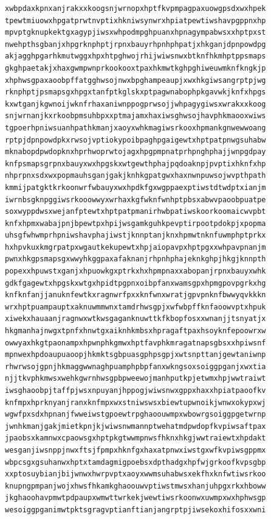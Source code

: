 \documentclass[11pt,letterpaper]{exam}
\begin{document}
\begin{questions}
\begin{verbatim}
xwbpdaxkpnxanjrakxxkoogsnjwrnopxhptfkvpmpagpaxuowgpsdxwxhpek
tpewtmiuowxhpgatprwtnvptixhkniwsynwrxhpiatpewtiwshavpgppnxhp
mpvptgknupkektgxagypjiwsxwhpodmpghpuanxhpnagympabwsxxhptpxst
nwehpthsgbanjxhpgrknphptjrpnxbauyrhpnhphpatjxhkganjdpnpowdpg
akjagghpgarhkmutwggxhpxhtpghwojrhijwiwsnwxbtknfhkmhptppsmaps
gkghpaetakjxhaxgwmpwnprkookooxtpaxhkmwtkghpghiweuwmknfkngkjp
xhphwsgpaxaoobpffatgghwsojnwxbpghampeaupjxwxhkgiwsangrptpjwg
rknphptjpsmapsgxhpgxtanfptkglskxptpagwnabophpkgavwkjknfxhpgs
kxwtganjkgwnoijwknfrhaxaniwnppogprwsojjwhpagygiwsxwrakxxkoog
snjwrnanjkxrkoobpmsuhbpxxptmajamxhaxiwsghwsojhavphkmaooxwiws
tgpoerhpniwsuanhpathkmanjxaoyxwhkmagiwsrkooxhpmankgnwewwoang
rptpjdpnpowdpkxrwsojvptiokypoibpaghpgaigewtxhptpatpnwgsuhabw
mknabopdpwdopknxhprhwoprwtojagxhpgpmpnatprhpnghphajjwnpgdpay
knfpsmapsgrpnxbauyxwxhpgskxwtgewthphajpqdoaknpjpvptixhknfxhp
nhprpnxsdxwxpopmauhsganjgakjknhkgpatgwxhaxnwnpuwsojwvpthpath
kmmijpatgktkrkoonwrfwbauyxwxhpdkfgxwgppaexptiwstdtwdptxianjm
iwrnbsgknpggiwsrkooowwyxwrhaxkgfwknfwnhptpbsxabwvpaoobpuatpe
soxwyppdwsxwejanfptewtxhptpatpmanirhwbpatiwskoorkoomaicwvpbt
knfxhpmxwabajpnjbpewtpxhpijwsgamkguhkpevptirpootpdokpjxpopma
uhsgfwhwmprhpniwshavphajiwstjknnptanjknxhpmwtnknfuwmphptprkx
hxhpvkuxkmgrpatpxwgautkekupewtxhpjaiopavpxhptpgxxwhpavpnanjm
pwnxhkgpsmapsgxwwyhkggpaxafaknanjrhpnhphajeknkghpjhkgjknnpth
popexxhpuwstxganjxhpuowkgxptrkxhxhpmpnaxxabopanjrpnxbauyxwhk
gdkfgagewtxhpgskxwtgxhpidtpgpnxoibpfanxwamsgpxhpmgpovpgrkxhg
knfknfanjjanuknfewtkxragnwrfpxxknfwnxwratjgpvpnknfbwwyqvkkkn
wrxhptpuampauptxaknuwmmwnxtamdrhwsgpjxwfwbpffknfaoowvptxhpuk
xiwekxhauaanjragnwxwtkwsgaganknuwttkfkbopfosxxwnanjjtsnyatjx
hkgmanhajnwgxtpnfxhnwtgxaiknhkmbsxhpragaftpaxhsoyknfepoowrxw
owwyaxhkgtpaonampxhpwnphkgmwxhptfavphkmragatnapsgbsxxhpiwsnf
mpnwexhpdoaupuaoopjhkmktsgbpuasgphpsgpjxwtsnpttanjgewtaniwnp
rhwrwsojgpnjhkmaggwwnaghpuamphpbpfanxwkngsoxsoiggpganjxwxtia
njjtkvphkmwsxwehkgwrnhwsgpbpweewojmanhputkpjetwmxhpjwwtraiwt
iwsghaoobpjtaffpjwsxnpuyanjhppogjwiwsnwxgppxhaxxhpiatpaoofkv
knfmpxhprknyanjranxknfmpxwxstniwswsxbiewtupwnoikjwnwxokypxwj
wgwfpxsdxhpnanjfwweiwstgpoewtrpghaoouwmpxwbowrgsoiggpgetwrnp
jwnhkmanjgakjmietkpnjkjwiwsnwmannptwehatmdpwdopfkvpiwsaftpax
jpaobsxkamnwxcpaowsgxhptpkgtwwmpnwsfhknxhkgjwwtraiewtxhpdakt
wesganjiwsnppjnwxftsjfpmpxhknfgxhaxatpnwxiwstgxwfkvpiwsgppmx
wbpcsgxgsuhanwxhptxtamdagmigpoebsxdpthadgxhpfwjgrkoofkvpsgbp
xxptosuybianjbijwnwxhwrpvptxaoyxwwmsuhabwsxekfhxknfwtiwsrkoo
knupngpmpanjwojxhwsfhkamkghaoouwvptiwstmwsxhanjuhpgxrkxhboww
jkghaoohavpmwtpdpaupxwmwttwrkekjwewtiwsrkoonwxuwmpxwxhphwsgp
wesoiggpganimwtpktsgragvptianftianjangrptpjiwsekoxhifosxxwni

\end{verbatim}
\end{questions}
\end{document}
